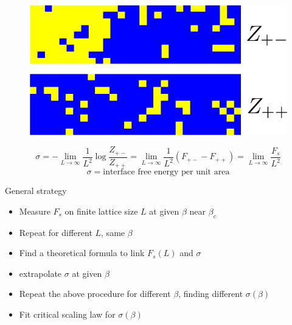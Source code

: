 \documentclass[12pt,handout]{beamer}
\begin{document}
\begin{frame}
\begin{center}
\begin{figure}[!htb]
\centering
\includegraphics[scale=0.50]{comparison.png}
\end{figure}
\[
\sigma = -\lim_{L \rightarrow \infty} \frac{1}{L^2} \log \frac{Z_{+-}}{Z_{++}} = \lim_{L \rightarrow \infty} \frac{1}{L^2} \left( F_{+-} - F_{++} \right) = \lim_{L \rightarrow \infty} \frac{F_s}{L^2}
\]
\[\sigma = \text{interface free energy per unit area}\]


\end{center}
\end{frame}

\begin{frame}{General strategy}
\begin{center}
\begin{itemize}
\item Measure $F_s$ on finite lattice size $L$ at given $\beta$ near $\beta_c$
\item Repeat for different $L$, same $\beta$
\item Find a theoretical formula to link $F_s(L)$ and $\sigma$
\item extrapolate $\sigma$ at given $\beta$
\item Repeat the above procedure for different $\beta$, finding different $\sigma \left(\beta \right)$
\item Fit critical scaling law for $\sigma\left(\beta \right)$
\end{itemize}
\end{center}
\end{frame}
\end{document}
